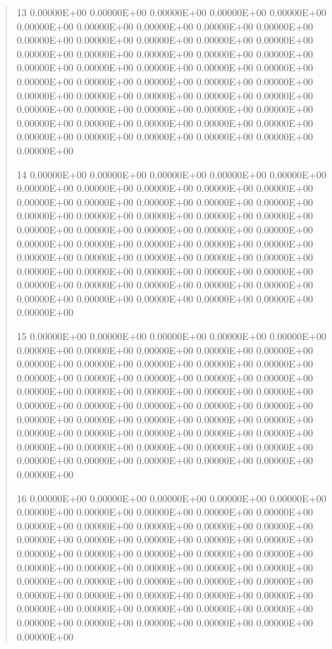 \documentclass[letterpaper,10pt,english]{sphinxmanual}
\begin{document}
\begin{quote}
\begin{DUlineblock}{0em}
\item[] 13   0.00000E+00  0.00000E+00  0.00000E+00  0.00000E+00  0.00000E+00  0.00000E+00  0.00000E+00  0.00000E+00  0.00000E+00  0.00000E+00  0.00000E+00  0.00000E+00  0.00000E+00  0.00000E+00  0.00000E+00  0.00000E+00  0.00000E+00  0.00000E+00  0.00000E+00  0.00000E+00  0.00000E+00  0.00000E+00  0.00000E+00  0.00000E+00  0.00000E+00  0.00000E+00  0.00000E+00  0.00000E+00  0.00000E+00  0.00000E+00  0.00000E+00  0.00000E+00  0.00000E+00  0.00000E+00  0.00000E+00  0.00000E+00  0.00000E+00  0.00000E+00  0.00000E+00  0.00000E+00  0.00000E+00  0.00000E+00  0.00000E+00  0.00000E+00  0.00000E+00  0.00000E+00  0.00000E+00  0.00000E+00  0.00000E+00  0.00000E+00  0.00000E+00
\item[] 14   0.00000E+00  0.00000E+00  0.00000E+00  0.00000E+00  0.00000E+00  0.00000E+00  0.00000E+00  0.00000E+00  0.00000E+00  0.00000E+00  0.00000E+00  0.00000E+00  0.00000E+00  0.00000E+00  0.00000E+00  0.00000E+00  0.00000E+00  0.00000E+00  0.00000E+00  0.00000E+00  0.00000E+00  0.00000E+00  0.00000E+00  0.00000E+00  0.00000E+00  0.00000E+00  0.00000E+00  0.00000E+00  0.00000E+00  0.00000E+00  0.00000E+00  0.00000E+00  0.00000E+00  0.00000E+00  0.00000E+00  0.00000E+00  0.00000E+00  0.00000E+00  0.00000E+00  0.00000E+00  0.00000E+00  0.00000E+00  0.00000E+00  0.00000E+00  0.00000E+00  0.00000E+00  0.00000E+00  0.00000E+00  0.00000E+00  0.00000E+00  0.00000E+00
\item[] 15   0.00000E+00  0.00000E+00  0.00000E+00  0.00000E+00  0.00000E+00  0.00000E+00  0.00000E+00  0.00000E+00  0.00000E+00  0.00000E+00  0.00000E+00  0.00000E+00  0.00000E+00  0.00000E+00  0.00000E+00  0.00000E+00  0.00000E+00  0.00000E+00  0.00000E+00  0.00000E+00  0.00000E+00  0.00000E+00  0.00000E+00  0.00000E+00  0.00000E+00  0.00000E+00  0.00000E+00  0.00000E+00  0.00000E+00  0.00000E+00  0.00000E+00  0.00000E+00  0.00000E+00  0.00000E+00  0.00000E+00  0.00000E+00  0.00000E+00  0.00000E+00  0.00000E+00  0.00000E+00  0.00000E+00  0.00000E+00  0.00000E+00  0.00000E+00  0.00000E+00  0.00000E+00  0.00000E+00  0.00000E+00  0.00000E+00  0.00000E+00  0.00000E+00
\item[] 16   0.00000E+00  0.00000E+00  0.00000E+00  0.00000E+00  0.00000E+00  0.00000E+00  0.00000E+00  0.00000E+00  0.00000E+00  0.00000E+00  0.00000E+00  0.00000E+00  0.00000E+00  0.00000E+00  0.00000E+00  0.00000E+00  0.00000E+00  0.00000E+00  0.00000E+00  0.00000E+00  0.00000E+00  0.00000E+00  0.00000E+00  0.00000E+00  0.00000E+00  0.00000E+00  0.00000E+00  0.00000E+00  0.00000E+00  0.00000E+00  0.00000E+00  0.00000E+00  0.00000E+00  0.00000E+00  0.00000E+00  0.00000E+00  0.00000E+00  0.00000E+00  0.00000E+00  0.00000E+00  0.00000E+00  0.00000E+00  0.00000E+00  0.00000E+00  0.00000E+00  0.00000E+00  0.00000E+00  0.00000E+00  0.00000E+00  0.00000E+00  0.00000E+00

\end{DUlineblock}
\end{quote}
\end{document}
